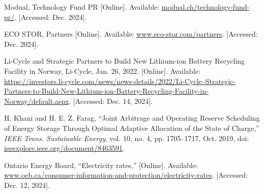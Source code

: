 \documentclass[conference]{IEEEtran}
\begin{document}
\begin{thebibliography}{00}
 Modual, Technology Fund PR [Online]. Available: \href{https://modual.ch/technology-fund-pr/}{modual.ch/technology-fund-pr/}. [Accessed: Dec. 2024].

 ECO STOR, Partners [Online]. Available: \href{https://www.eco-stor.com/partners}{www.eco-stor.com/partners}. [Accessed: Dec. 2024].

 Li-Cycle and Strategic Partners to Build New Lithium-ion Battery Recycling Facility in Norway, Li-Cycle, Jan. 26, 2022. [Online]. Available: \href{https://investors.li-cycle.com/news/news-details/2022/Li-Cycle--Strategic-Partners-to-Build-New-Lithium-ion-Battery-Recycling-Facility-in-Norway/default.aspx}{https://investors.li-cycle.com/news/news-details/2022/Li-Cycle--Strategic-Partners-to-Build-New-Lithium-ion-Battery-Recycling-Facility-in-Norway/default.aspx}. [Accessed: Dec. 14, 2024].

 H. Khani and H. E. Z. Farag, ``Joint Arbitrage and Operating Reserve Scheduling of Energy Storage Through Optimal Adaptive Allocation of the State of Charge,'' \textit{IEEE Trans. Sustainable Energy}, vol. 10, no. 4, pp. 1705--1717, Oct. 2019, doi: \href{https://ieeexplore.ieee.org/document/8463591}{ieeexplore.ieee.org/document/8463591}.

Ontario Energy Board, ``Electricity rates,'' [Online]. Available: \href{https://www.oeb.ca/consumer-information-and-protection/electricity-rates}{www.oeb.ca/consumer-information-and-protection/electricity-rates}. [Accessed: Dec. 12, 2024].


\end{thebibliography}
\end{document}
